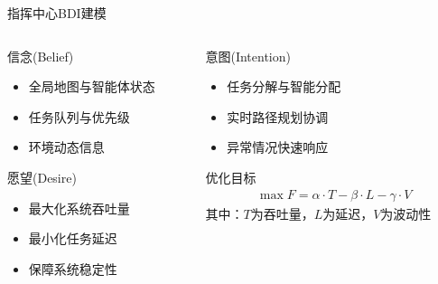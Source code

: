 \documentclass[
10pt,
aspectratio=169,
]{beamer}
\begin{document}
\begin{frame}{指挥中心BDI建模}
    \begin{columns}
        \begin{column}{0.5\textwidth}
            \begin{block}{信念(Belief)}
                \begin{itemize}
                    \item 全局地图与智能体状态
                    \item 任务队列与优先级
                    \item 环境动态信息
                \end{itemize}
            \end{block}
            
            \begin{alertblock}{愿望(Desire)}
                \begin{itemize}
                    \item 最大化系统吞吐量
                    \item 最小化任务延迟
                    \item 保障系统稳定性
                \end{itemize}
            \end{alertblock}
        \end{column}
        \begin{column}{0.5\textwidth}
            \begin{exampleblock}{意图(Intention)}
                \begin{itemize}
                    \item 任务分解与智能分配
                    \item 实时路径规划协调
                    \item 异常情况快速响应
                \end{itemize}
            \end{exampleblock}
            
            \begin{alertblock}{优化目标}
                \begin{align}
                    \max F = \alpha \cdot T - \beta \cdot L - \gamma \cdot V
                \end{align}
                其中：$T$为吞吐量，$L$为延迟，$V$为波动性
            \end{alertblock}
        \end{column}
    \end{columns}
\end{frame}
\end{document}
